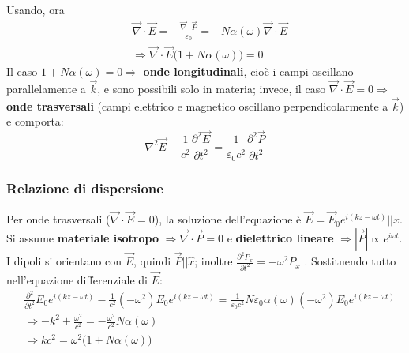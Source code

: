 \documentclass[10pt, a4paper]{scrartcl}
\numberwithin{equation}{subsection}
\theoremstyle{style1}
\begin{document}
Usando, ora
\begin{equation}
	\begin{split}
		&\vec{\nabla }\cdot \vec{E} = - \frac{\vec{\nabla }\cdot \vec{P}}{\varepsilon _0}= - N\alpha (\omega) \vec{\nabla }\cdot \vec{E}\\
		&\Rightarrow \vec{\nabla }\cdot \vec{E}\big(1+ N\alpha (\omega)\big) = 0
	\end{split}
\end{equation}
Il caso $1+N\alpha (\omega) = 0\Rightarrow $ \textbf{onde longitudinali}, cio\`e i campi oscillano parallelamente a $\vec{k}$, e sono possibili solo in materia; invece, il caso $\vec{\nabla }\cdot \vec{E}= 0\Rightarrow $ \textbf{onde trasversali} (campi elettrico e magnetico oscillano perpendicolarmente a $\vec{k}$) e comporta:
\begin{equation}
	\nabla ^2 \vec{E}-\frac{1}{c^2}\frac{\partial ^2 \vec{E}}{\partial t^2} = \frac{1}{\varepsilon _0 c^2} \frac{\partial ^2 \vec{P}}{\partial t^2} 
\end{equation}
\subsubsection{Relazione di dispersione}
Per onde trasversali ($\vec{\nabla }\cdot \vec{E}=0$), la soluzione dell'equazione \`e $\vec{E}= \vec{E}_0 e^{i(kz-\omega t)} | | \hat{x} $. Si assume \textbf{materiale isotropo} $\Rightarrow \vec{\nabla }\cdot \vec{P}=0$ e \textbf{dielettrico lineare} $\Rightarrow \left\lvert \vec{P} \right\rvert \propto e^{i\omega t} $. I dipoli si orientano con $\vec{E}$, quindi $\vec{P}| | \hat{x}$; inoltre $\frac{\partial ^2 P_x}{\partial t^2} =-\omega^2 P_x$ . Sostituendo tutto nell'equazione differenziale di $\vec{E}$:
\begin{equation}
	\begin{split}
		&\frac{\partial ^2}{\partial t^2} E_0e^{i(kz-\omega t)} - \frac{1}{c^2}(-\omega^2) E_0 e^{i(kz-\omega t)}=\frac{1}{\varepsilon _0 c^2}N\varepsilon _0 \alpha (\omega) (-\omega^2) E_0e^{i(kz-\omega t)}  \\
		&\Rightarrow -k^2 + \frac{\omega^2}{c^2} = - \frac{\omega^2}{c^2} N\alpha (\omega) \\
		&\Rightarrow kc^2 = \omega^2 \big(1+N\alpha (\omega)\big)
	\end{split}
\end{equation}
\end{document}
